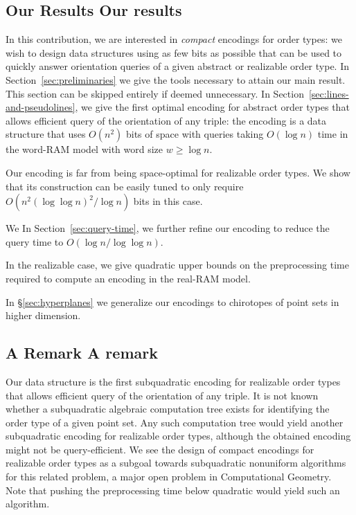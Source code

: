 \subsection*{\iftitlecase%
Our Results\else%
Our results\fi}\label{sec:results}

In this contribution, we are interested in \emph{compact} encodings for
order types: we wish to design data structures using as few bits as possible
that can be used to quickly answer orientation queries of a given abstract or
realizable order type.
\ifeurocg%
\DefinitionEncoding*
\fi%
%
\ifjournal%
	In Section~\ref{sec:preliminaries} we give the tools necessary to
	attain our main result. This section can be skipped entirely if deemed
	unnecessary.
\fi%
In Section~\ref{sec:lines-and-pseudolines}, we
give the first optimal encoding for abstract
order types that allows efficient query of the orientation of any triple: the
encoding is a data structure that uses \( O(n^2) \) bits of space with queries
taking \(O(\log n)\) time in the word-RAM model with word size \(w \geq \log
n\).

%
Our encoding is far from being space-optimal for realizable order types.
We show that its construction can be easily tuned to only require \(O(n^2
{(\log{\log{n}})}^2 / \log{n})\) bits in this case.

%
\ifeurocg%
We \else%
In Section~\ref{sec:query-time}, we \fi%
further refine our encoding to
reduce the query time to \(O(\log{n}/\log{\log{n}})\).


%
In the realizable case, we give quadratic upper bounds on the
preprocessing time required to compute an encoding in the real-RAM model.


%
In \S\ref{sec:hyperplanes} we
generalize our encodings to chirotopes of
point sets in higher dimension.



\subsection*{\iftitlecase%
A Remark\else%
A remark\fi}\label{sec:a-remark}

Our data structure is the first subquadratic encoding for realizable order
types that allows efficient query of the orientation of any triple. It is not
known whether a subquadratic algebraic computation tree exists for
identifying the order type of a given point set.
Any such computation tree would yield another subquadratic encoding for
realizable order types, although the obtained encoding
might not be query-efficient. We see the design of compact encodings for realizable
order types as a subgoal towards subquadratic nonuniform algorithms for this
related problem, a major open problem in Computational Geometry. Note that
pushing the preprocessing time below quadratic would yield such an algorithm.
